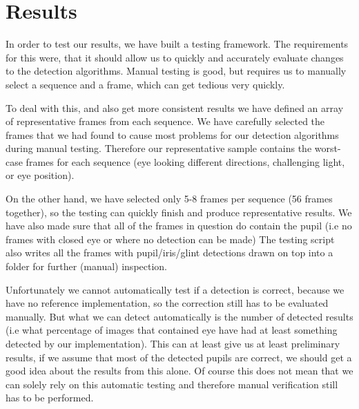 \section{Results}

In order to test our results, we have built a testing framework. The requirements for this were, that it should allow us to quickly and accurately evaluate changes to the detection algorithms. Manual testing is good, but requires us to manually select a sequence and a frame, which can get tedious very quickly.

To deal with this, and also get more consistent results we have defined an array of representative frames from each sequence. We have carefully selected the frames that we had found to cause most problems for our detection algorithms during manual testing. Therefore our representative sample contains the worst-case frames for each sequence (eye looking different directions, challenging light, or eye position). 

On the other hand, we have selected only 5-8 frames per sequence (56 frames together), so the testing can quickly finish and produce representative results. We have also made sure that all of the frames in question do contain the pupil (i.e no frames with closed eye or where no detection can be made) The testing script also writes all the frames with pupil/iris/glint detections drawn on top into a folder for further (manual) inspection.

Unfortunately we cannot automatically test if a detection is correct, because we have no reference implementation, so the correction still has to be evaluated manually. But what we can detect automatically is the number of detected results (i.e what percentage of images that contained eye have had at least something detected by our implementation). This can at least give us  at least preliminary results, if we assume that most of the detected pupils are correct, we should get a good idea about the results from this alone. Of course this does not mean that we can solely rely on this automatic testing and therefore manual verification still has to be performed.

